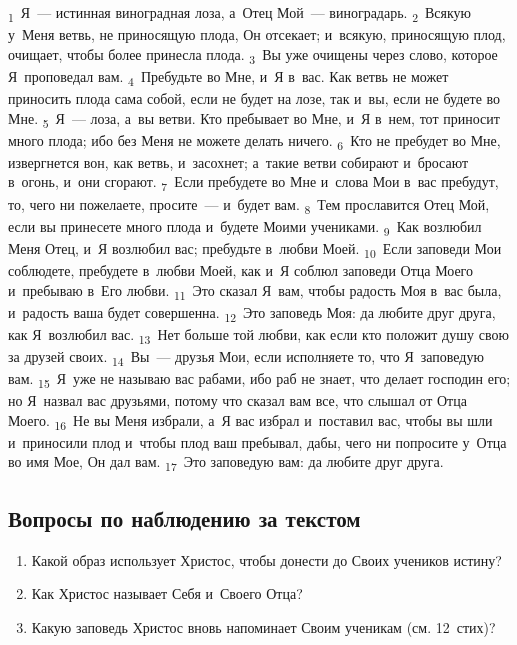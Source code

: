 \documentclass[a4paper,12pt]{article}
\begin{document}
\textsubscript{1}~Я~— истинная виноградная лоза, а~Отец Мой~— виноградарь. \textsubscript{2}~Всякую у~Меня ветвь, не приносящую плода, Он отсекает; и~всякую, приносящую плод, очищает, чтобы более принесла плода. \textsubscript{3}~Вы уже очищены через слово, которое Я~проповедал вам. \textsubscript{4}~Пребудьте во Мне, и~Я в~вас. Как ветвь не может приносить плода сама собой, если не будет на лозе, так и~вы, если не будете во Мне. \textsubscript{5}~Я~— лоза, а~вы ветви. Кто пребывает во Мне, и~Я в~нем, тот приносит много плода; ибо без Меня не можете делать ничего. \textsubscript{6}~Кто не пребудет во Мне, извергнется вон, как ветвь, и~засохнет; а~такие ветви собирают и~бросают в~огонь, и~они сгорают. \textsubscript{7}~Если пребудете во Мне и~слова Мои в~вас пребудут, то, чего ни пожелаете, просите~--- и~будет вам. \textsubscript{8}~Тем прославится Отец Мой, если вы принесете много плода и~будете Моими учениками. \textsubscript{9}~Как возлюбил Меня Отец, и~Я возлюбил вас; пребудьте в~любви Моей. \textsubscript{10}~Если заповеди Мои соблюдете, пребудете в~любви Моей, как и~Я соблюл заповеди Отца Моего и~пребываю в~Его любви. \textsubscript{11}~Это сказал Я~вам, чтобы радость Моя в~вас была, и~радость ваша будет совершенна. \textsubscript{12}~Это заповедь Моя: да любите друг друга, как Я~возлюбил вас. \textsubscript{13}~Нет больше той любви, как если кто положит душу свою за друзей своих. \textsubscript{14}~Вы~--- друзья Мои, если исполняете то, что Я~заповедую вам. \textsubscript{15}~Я~уже не называю вас рабами, ибо раб не знает, что делает господин его; но Я~назвал вас друзьями, потому что сказал вам все, что слышал от Отца Моего. \textsubscript{16}~Не вы Меня избрали, а~Я вас избрал и~поставил вас, чтобы вы шли и~приносили плод и~чтобы плод ваш пребывал, дабы, чего ни попросите у~Отца во имя Мое, Он дал вам. \textsubscript{17}~Это заповедую вам: да любите друг друга. 

\subsection*{Вопросы по наблюдению за текстом}
\begin{enumerate}
    \item Какой образ использует Христос, чтобы донести до Своих учеников истину? 
    
    \myline
    
    \myline
    \item Как Христос называет Себя и~Своего Отца? 
    
    \myline
    
    \myline
    \item Какую заповедь Христос вновь напоминает Своим ученикам (см. 12~стих)? 
    
    \myline
    
    \myline
\end{enumerate}
\end{document}
